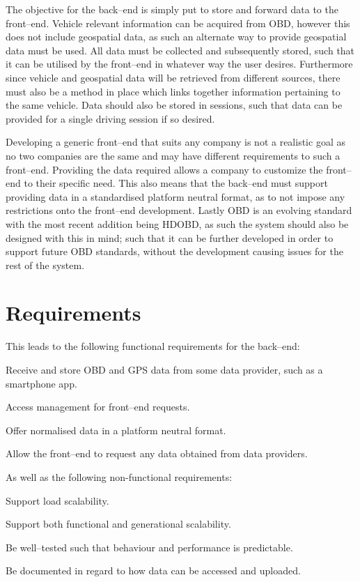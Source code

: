 \bigskip
The objective for the back--end is simply put to store and forward data to the front--end.
Vehicle relevant information can be acquired from \ac{OBD}, however this does not include geospatial data, as such an alternate way to provide geospatial data must be used.
All data must be collected and subsequently stored, such that it can be utilised by the front--end in whatever way the user desires.
Furthermore since vehicle and geospatial data will be retrieved from different sources, there must also be a method in place which links together information pertaining to the same vehicle.
Data should also be stored in sessions, such that data can be provided for a single driving session if so desired.

Developing a generic front--end that suits any company is not a realistic goal as no two companies are the same and may have different requirements to such a front--end.
Providing the data required allows a company to customize the front--end to their specific need.
This also means that the back--end must support providing data in a standardised platform neutral format, as to not impose any restrictions onto the front--end development.
Lastly \ac{OBD} is an evolving standard with the most recent addition being \ac{HDOBD}, as such the system should also be designed with this in mind; such that it can be further developed in order to support future \ac{OBD} standards, without the development causing issues for the rest of the system.

\section{Requirements}\label{sec:requirements}
This leads to the following functional requirements for the back--end:
\begin{eletterate}
    \item Receive and store \ac{OBD} and GPS data from some data provider, such as a smartphone app.
    \item Access management for front--end requests.
    \item Offer normalised data in a platform neutral format. %
    \item Allow the front--end to request any data obtained from data providers.
\end{eletterate}
As well as the following non-functional requirements:
\begin{eletterate}[resume]
    \item Support load scalability.
    \item Support both functional and generational scalability.
    \item Be well--tested such that behaviour and performance is predictable.
    \item Be documented in regard to how data can be accessed and uploaded.
\end{eletterate}
